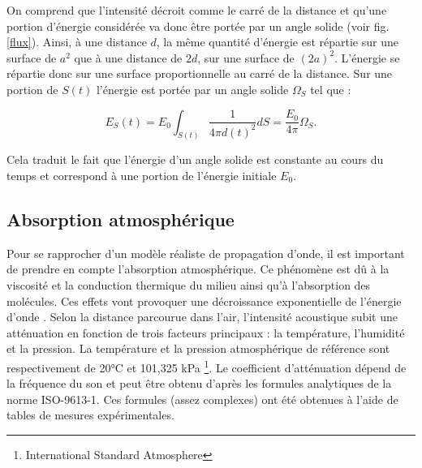 On comprend que l'intensité décroit comme le carré de la distance et qu'une portion d'énergie considérée va donc être portée par un angle solide (voir fig. \ref{flux}). Ainsi, à une distance $d$, la même quantité d'énergie est répartie sur une surface de $a^2$ que à une distance de $2d$, sur une surface de $(2a)^2$. L'énergie se répartie donc sur une surface proportionnelle au carré de la distance. Sur une portion de $S(t)$ l'énergie est portée par un angle solide $\Omega_{S}$ tel que :

\begin{equation} \label{eq_energie}
E_{S}(t) = E_0 \int_{S(t)}  \frac{1}{4\pi  d(t)^2} dS = \frac{E_0}{4\pi}  \Omega_{S}.
\end{equation}

Cela traduit le fait que l'énergie d'un angle solide est constante au cours du temps et correspond à une portion de l'énergie initiale $E_0$.





\subsection{Absorption atmosphérique}
 \label{sect_absAIr}
Pour se rapprocher d'un modèle réaliste de propagation d'onde, il est important de prendre en compte l'absorption atmosphérique. Ce phénomène est dû à la viscosité et la conduction thermique du milieu ainsi qu'à l'absorption des molécules. Ces effets vont provoquer une décroissance exponentielle de l'énergie d'onde \cite[p. 68-70]{jouhaneau}. Selon la distance parcourue dans l'air, l'intensité acoustique subit une atténuation en fonction de trois facteurs principaux : la température, l'humidité et la pression. La température et la pression atmosphérique de référence sont respectivement de 20°C et 101,325 kPa \footnote{International Standard Atmosphere}. Le coefficient d'atténuation dépend de la fréquence du son et peut être obtenu d'après les formules analytiques de la norme ISO-9613-1. Ces formules (assez complexes) ont été obtenues à l'aide de tables de mesures expérimentales.

